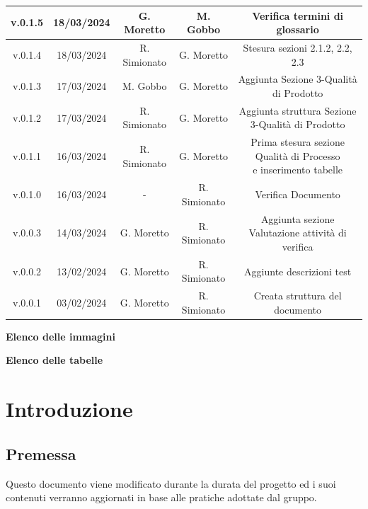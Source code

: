 \documentclass[5pt]{article}
\begin{document}
\begin{table}[H]
{\begin{tabular}{|c|c|c|c|c|}
				\hline
				v.0.1.5 & 18/03/2024 & G. Moretto & M. Gobbo & Verifica termini di glossario \\
				\hline
				v.0.1.4 & 18/03/2024 & R. Simionato & G. Moretto & Stesura sezioni 2.1.2, 2.2, 2.3 \\
				\hline
				v.0.1.3 & 17/03/2024 & M. Gobbo & G. Moretto & Aggiunta Sezione 3-Qualità di Prodotto \\
				\hline
				v.0.1.2 & 17/03/2024 & R. Simionato & G. Moretto & Aggiunta struttura Sezione 3-Qualità di Prodotto \\
				\hline
				v.0.1.1 & 16/03/2024 & R. Simionato & G. Moretto & \shortstack{Prima stesura sezione Qualità di Processo\\e inserimento tabelle} \\
				\hline
				v.0.1.0 & 16/03/2024 & - & R. Simionato & Verifica Documento \\
				\hline
				v.0.0.3 & 14/03/2024 & G. Moretto & R. Simionato & Aggiunta sezione Valutazione attività di verifica \\
				\hline
				v.0.0.2 & 13/02/2024 & G. Moretto & R. Simionato  &  Aggiunte descrizioni test\\
				\hline
				v.0.0.1 & 03/02/2024 & G. Moretto & R. Simionato  & Creata struttura del documento \\
				\hline
	   		\end{tabular}
		}
	 	\label{tab:conference}
    \end{table}

	\pagebreak
	\tableofcontents
	\pagebreak

	\textbf{\Large Elenco delle immagini} \\
	\makeatletter
	\makeatother
	
	\pagebreak
	\textbf{\Large Elenco delle tabelle} \\
	\makeatletter
	\makeatother
	
	\pagebreak
	
	\section{Introduzione}
	
	\subsection{Premessa}
	Questo documento viene modificato durante la durata del progetto ed i suoi contenuti verranno aggiornati in base alle pratiche adottate dal gruppo.
	
\end{document}
